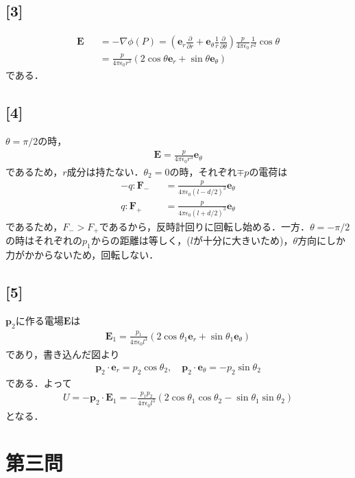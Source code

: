 \documentclass[12pt,dvipdfmx]{jsarticle}
\begin{document}
\subsection*{\large{[3]}}
\begin{eqnarray}
  \bm{E} &&= -\nabla\phi(P) = \left( \bm{e}_r\frac{\partial}{\partial r} + \bm{e}_{\theta}\frac{1}{r}\frac{\partial}{\partial\theta} \right)\frac{p}{4\pi\epsilon_0}\frac{1}{r^2}\cos\theta\\
  &&= \frac{p}{4\pi\epsilon_0r^3}\left( 2\cos\theta\bm{e}_r + \sin\theta\bm{e}_\theta \right)
\end{eqnarray}
である．
\subsection*{\large{[4]}}
$\theta=\pi/2$の時，
\begin{eqnarray}
  \bm{E} = \frac{p}{4\pi\epsilon_0 r^3}\bm{e}_\theta
\end{eqnarray}
であるため，$r$成分は持たない．$\theta_2 = 0$の時，それぞれ$\mp p$の電荷は
\begin{eqnarray}
  -q : \bm{F}_- &&= \frac{p}{4\pi\epsilon_0 (l-d/2)^3}\bm{e}_\theta\\
  q : \bm{F}_+ &&= \frac{p}{4\pi\epsilon_0 (l+d/2)^3}\bm{e}_\theta
\end{eqnarray}
であるため，$F_->F_+$であるから，反時計回りに回転し始める．一方．$\theta=-\pi/2$の時はそれぞれの$p_1$からの距離は等しく，($l$が十分に大きいため)，$\theta$方向にしか力がかからないため，回転しない．
\subsection*{\large{[5]}}
$\bm{p}_2$に作る電場$\bm{E}$は
\begin{eqnarray}
  \bm{E}_1 = \frac{p_1}{4\pi\epsilon_0l^3} \left( 2\cos\theta_1\bm{e}_r + \sin\theta_1\bm{e}_\theta \right)
\end{eqnarray}
であり，書き込んだ図より
\begin{eqnarray}
  \bm{p}_2\cdot\bm{e}_r =p_2 \cos\theta_2, \quad \bm{p}_2\cdot\bm{e}_\theta = -p_2\sin\theta_2
\end{eqnarray}
である．よって
\begin{eqnarray}
  U = -\bm{p}_2\cdot\bm{E}_1 = -\frac{p_1p_2}{4\pi\epsilon_0l^3} \left( 2\cos\theta_1\cos\theta_2- \sin\theta_1\sin\theta_2\right)
\end{eqnarray}
となる．
\newpage
\section*{\Large{第三問}}
\end{document}
